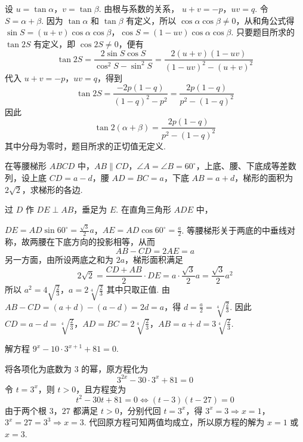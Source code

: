 \begin{solution}
设 \(u=\tan\alpha\)，\(v=\tan\beta\). 由根与系数的关系，
\(u+v=-p\)，\(uv=q\).
令 \(S=\alpha+\beta\). 因为 \(\tan\alpha\) 和 \(\tan\beta\) 有定义，所以 \(\cos\alpha\cos\beta\ne0\)，从和角公式得
\(\sin S=(u+v)\cos\alpha\cos\beta\)，\(\cos S=(1-uv)\cos\alpha\cos\beta\).
只要题目所求的 \(\tan2S\) 有定义，即 \(\cos2S\ne0\)，便有
\[
\tan2S=\frac{2\sin S\cos S}{\cos^{2}S-\sin^{2}S}
 =\frac{2(u+v)(1-uv)}{(1-uv)^{2}-(u+v)^{2}}
\]
代入 \(u+v=-p\)，\(uv=q\)，得到
\[
\tan2S=\frac{-2p(1-q)}{(1-q)^{2}-p^{2}}
 =\frac{2p(1-q)}{p^{2}-(1-q)^{2}}
\]
因此
\[
\tan2\left(\alpha+\beta\right)=\frac{2p(1-q)}{p^{2}-(1-q)^{2}}
\]
其中分母为零时，题目所求的正切值无定义.
\end{solution}

\begin{problem}
在等腰梯形 \(ABCD\) 中，\(AB\parallel CD\)，\(\angle A=\angle B=60^{\circ}\)，上底、腰、下底成等差数列，设上底 \(CD=a-d\)，腰 \(AD=BC=a\)，下底 \(AB=a+d\)，梯形的面积为 \(2\sqrt{2}\)，求梯形的各边.

\end{problem}

\begin{solution}
过 \(D\) 作 \(DE\perp AB\)，垂足为 \(E\). 在直角三角形 \(ADE\) 中，


\(DE=AD\sin60^{\circ}=\frac{\sqrt{3}}{2}a\)，\(AE=AD\cos60^{\circ}=\frac{a}{2}\).
等腰梯形关于两底的中垂线对称，故两腰在下底方向的投影相等，从而
\[
AB-CD=2AE=a
\]
另一方面，由所设两底之和为 \(2a\)，梯形面积满足
\[
2\sqrt{2}=\frac{CD+AB}{2}\cdot DE
=a\cdot\frac{\sqrt{3}}{2}a
=\frac{\sqrt{3}}{2}a^{2}
\]
所以
\(a^{2}=4\sqrt{\frac{2}{3}}\)，\(a=2\sqrt[4]{\frac{2}{3}}\)
其中只取正值. 由 \(AB-CD=(a+d)-(a-d)=2d=a\)，得 \(d=\frac{a}{2}=\sqrt[4]{\frac{2}{3}}\). 因此
\(CD=a-d=\sqrt[4]{\frac{2}{3}}\)，\(AD=BC=2\sqrt[4]{\frac{2}{3}}\)，\(AB=a+d=3\sqrt[4]{\frac{2}{3}}\).
\end{solution}

\begin{problem}
解方程 \(9^{x}-10\cdot3^{x+1}+81=0\).
\end{problem}

\begin{solution}
将各项化为底数为 \(3\) 的幂，原方程化为
\[
3^{2x}-30\cdot3^{x}+81=0
\]
令 \(t=3^{x}\)，则 \(t>0\)，且方程变为
\[
t^{2}-30t+81=0
\Longleftrightarrow
(t-3)(t-27)=0
\]
由于两个根 \(3\)，\(27\) 都满足 \(t>0\)，分别代回 \(t=3^{x}\)，得
\(3^{x}=3\Longrightarrow x=1\)，\(3^{x}=27=3^{3}\Longrightarrow x=3\).
代回原方程可知两值均成立，所以原方程的解为 \(x=1\) 或 \(x=3\).
\end{solution}

